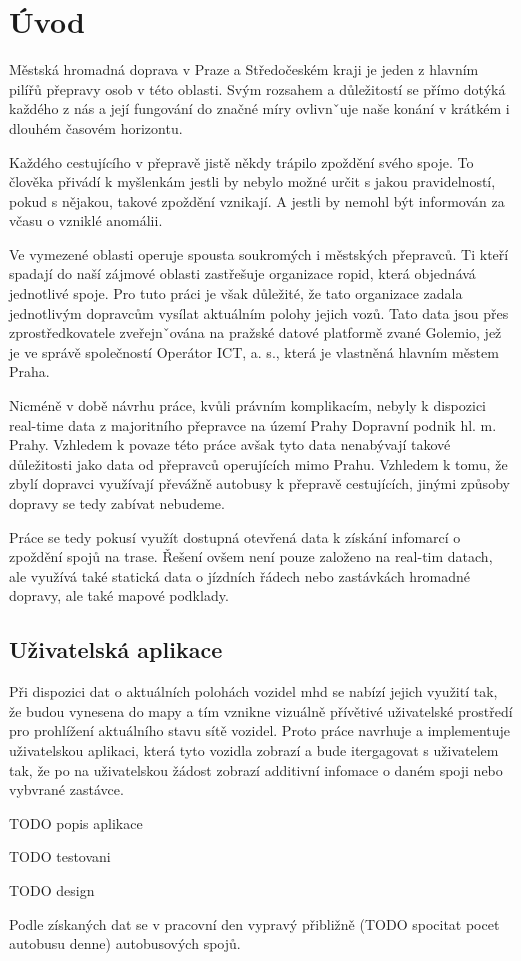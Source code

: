 \chapter*{Úvod}

Městská hromadná doprava v Praze a Středočeském kraji je jeden z hlavním pilířů přepravy osob v této oblasti. Svým rozsahem a důležitostí se přímo dotýká každého z nás a její fungování do značné míry ovlivnˇuje naše konání v krátkém i dlouhém časovém horizontu.

\bigbreak

Každého cestujícího v přepravě jistě někdy trápilo zpoždění svého spoje. To člověka přivádí k myšlenkám jestli by nebylo možné určit s jakou pravidelností, pokud s nějakou, takové zpoždění vznikají. A jestli by nemohl být informován za včasu o vzniklé anomálii.

\bigbreak

Ve vymezené oblasti operuje spousta soukromých i městských přepravců. Ti kteří spadají do naší zájmové oblasti zastřešuje organizace \gls{ropid}, která objednává jednotlivé spoje. Pro tuto práci je však důležité, že tato organizace zadala jednotlivým dopravcům vysílat aktuálním polohy jejich vozů. Tato data jsou přes zprostředkovatele zveřejnˇována na pražské datové platformě zvané Golemio, jež je ve správě společností Operátor ICT, a. s., která je vlastněná hlavním městem Praha.

\bigbreak

Nicméně v době návrhu práce, kvůli právním komplikacím, nebyly k dispozici real-time data z majoritního přepravce na území Prahy Dopravní podnik hl. m. Prahy. Vzhledem k povaze této práce avšak tyto data nenabývají takové důležitosti jako data od přepravců operujících mimo Prahu. Vzhledem k tomu, že zbylí dopravci využívají převážně autobusy k přepravě cestujících, jinými způsoby dopravy se tedy zabívat nebudeme.

\bigbreak

Práce se tedy pokusí využít dostupná otevřená data k získání infomarcí o zpoždění spojů na trase. Řešení ovšem není pouze založeno na real-tim datach, ale využívá také statická data o jízdních řádech nebo zastávkách hromadné dopravy, ale také mapové podklady.

\section*{Uživatelská aplikace}

Při dispozici dat o aktuálních polohách vozidel \gls{mhd} se nabízí jejich využití tak, že budou vynesena do mapy a tím vznikne vizuálně přívětivé uživatelské prostředí pro prohlížení aktuálního stavu sítě vozidel. Proto práce navrhuje a implementuje uživatelskou aplikaci, která tyto vozidla zobrazí a bude itergagovat s uživatelem tak, že po na uživatelskou žádost zobrazí additivní infomace o daném spoji nebo vybvrané zastávce.

\bigbreak

TODO popis aplikace

TODO testovani

TODO design




Podle získaných dat se v pracovní den vypravý přibližně (TODO spocitat pocet autobusu denne) autobusových spojů.
